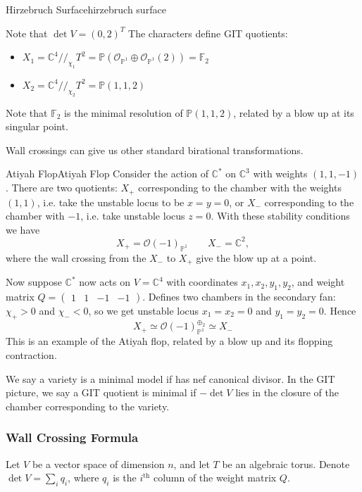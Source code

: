 \begin{example}{Hirzebruch Surface}{hirzebruch surface}
\begin{centering}
\begin{tikzpicture}[x=0.75pt,y=0.75pt,yscale=-1,xscale=1]
\end{tikzpicture}
	
\end{centering}

Note that $\det V=(0,2)^T$
The characters define GIT quotients: 
\begin{itemize}
	\item  $X_{1}= \mathbb{C}^{4}//_{\chi_{1}}T^{2}= \mathbb{P}(\mathcal{O}_{\mathbb{P}^{1}}\oplus \mathcal{O}_{\mathbb{P}^{1}}(2)) = \mathbb{F}_2$
	\item  $X_{2}= \mathbb{C}^{4}//_{\chi_{2}}T^{2}= \mathbb{P}(1,1,2)$
\end{itemize}

Note that $\mathbb{F}_2$ is the minimal resolution of $\mathbb{P}(1,1,2)$, related by a blow up at its singular point.
\end{example}

Wall crossings can give us other standard birational transformations.

\begin{example}{Atiyah Flop}{Atiyah Flop}
Consider the action of $\mathbb{C}^{*}$ on $\mathbb{C}^3$ with weights $(1,1,-1)$. 
There are two quotients: $X_+$ corresponding to the chamber with the weights $(1,1)$, i.e. take the unstable locus to be $x=y= 0$, or $X_-$ corresponding to the chamber with $-1$, i.e. take unstable locus $z = 0$. With these stability conditions we have $$
X_{+}= \mathcal{O}(-1)_{\mathbb{P}^{1}} \qquad X_{-}= \mathbb{C}^2, $$ where the wall crossing from the $X_-$ to $X_+$ give the blow up at a point. 

Now suppose $\mathbb{C}^*$ now acts on $V = \mathbb{C}^4$  with coordinates $x_{1}, x_{2}, y_{1},y_{2}$, and weight matrix $Q = \begin{pmatrix}1&1&-1&-1\end{pmatrix}$. 
Defines two chambers in the secondary fan: $\chi_{+}>0$ and $\chi_{-}<0$, so we get unstable locus $x_{1}= x_{2}= 0$ and $y_{1}= y_{2}=0$. Hence $$
X_{+}\simeq \mathcal{O}(-1)_{\mathbb{P}^{1}}^{\oplus_{2}}\simeq X_-
$$This is an example of the Atiyah flop, related by a blow up and its flopping contraction. 
\end{example}

We say a variety is a minimal model if has nef canonical divisor. In the GIT picture, we say a GIT quotient is minimal if $-\det V$ lies in the closure of the chamber corresponding to the variety. 

\subsubsection{Wall Crossing Formula}
Let $V$ be a vector space of dimension $n$, and let $T$ be an algebraic torus. Denote $\det V = \sum_i q_i$, where $q_i$ is the $i^\mathrm{th}$ column of the weight matrix $Q$. 

